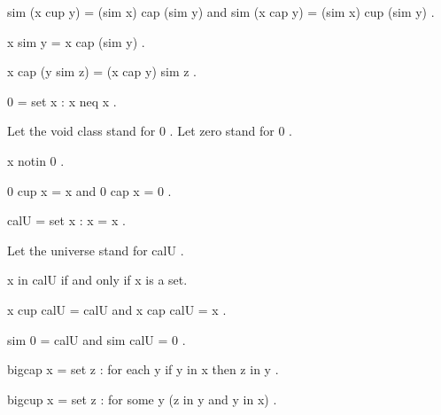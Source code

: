 \documentclass[a4paper,draft]{amsproc}
\begin{document}
\begin{forthel}
\begin{theorem}
 sim (x cup y) = (sim x) cap (sim y)  
and  sim (x cap y) = (sim x) cup (sim y) .
\end{theorem}

\begin{definition}  x sim y = x cap (sim y) .\end{definition}

\begin{theorem}
 x cap (y sim z) = (x cap y) sim z .
\end{theorem}

\begin{definition}  0 = { set  x : x neq x} .\end{definition}
Let the void class stand for  0 .
Let zero stand for  0 .

\begin{theorem}
 x notin 0 .
\end{theorem}

\begin{theorem}
 0 cup x = x  and  0 cap x = 0 .
\end{theorem}

\begin{definition}
	 cal{U} = { set  x : x = x} .
\end{definition}
Let the universe stand for  cal{U} .

\begin{theorem}
 x in cal{U}  if and only if  x  is a set.
\end{theorem}

\begin{theorem}
 x cup cal{U} = cal{U}  and  x cap cal{U} = x .
\end{theorem}

\begin{theorem}
 sim 0 = cal{U}  and  sim cal{U} = 0 .
\end{theorem}

\begin{definition}  bigcap x = 
{ set  z :  for each  y  if  y in x  then  z in y} .\end{definition}

\begin{definition}  bigcup x = 
{ set  z :  for some  y   (z in y  and  y in x)} .\end{definition}


\end{forthel}
\end{document}
